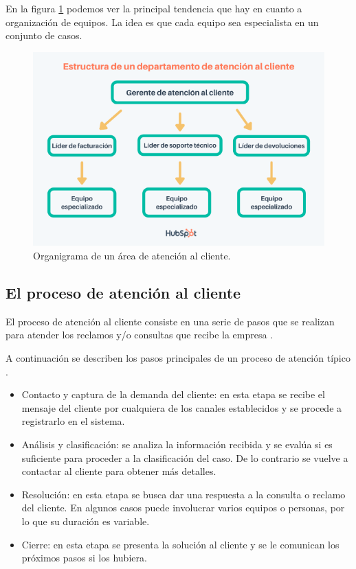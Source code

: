 En la figura \ref{fig:atencionestructura} podemos ver la principal tendencia que hay en cuanto a organización de equipos. La idea es que cada equipo sea especialista en un conjunto de casos.

\begin{figure}[htbp]
	\centering
	\includegraphics[width=.8\textwidth]{./Figures/atencionclienteestructura.png}
	\caption{Organigrama de un área de atención al cliente\protect\footnotemark.}
	\label{fig:atencionestructura}
\end{figure}


\subsection{El proceso de atención al cliente}

El proceso de atención al cliente consiste en una serie de pasos que se realizan para atender los reclamos y/o consultas que recibe la empresa \citep{WEBSITE:7}.

A continuación se describen los pasos principales de un proceso de atención típico \citep{WEBSITE:8}.

\begin{itemize}

\item Contacto y captura de la demanda del cliente: en esta etapa se recibe el mensaje del cliente por cualquiera de los canales establecidos y se procede a registrarlo en el sistema.
\item Análisis y clasificación: se analiza la información recibida y se evalúa si es suficiente para proceder a la clasificación del caso. De lo contrario se vuelve a contactar al cliente para obtener más detalles.
\item Resolución: en esta etapa se busca dar una respuesta a la consulta o reclamo del cliente. En algunos casos puede involucrar varios equipos o personas, por lo que su duración es variable.
\item Cierre: en esta etapa se presenta la solución al cliente y se le comunican los próximos pasos si los hubiera.

\end{itemize}

